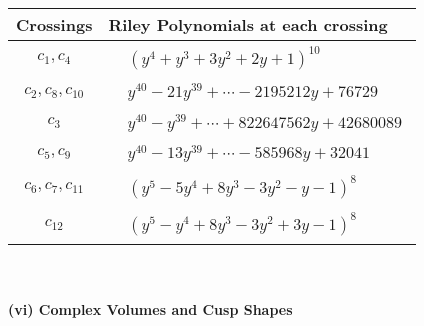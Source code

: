 \documentclass[1p]{elsarticle_modified}
\theoremstyle{definition}
\begin{document}
\begin{tabular}{m{50pt}|m{274pt}}
Crossings & \hspace{64pt}Riley Polynomials at each crossing \\
\hline $$\begin{aligned}c_{1},c_{4}\end{aligned}$$&$\begin{aligned}
&(y^4+y^3+3 y^2+2 y+1)^{10}
\end{aligned}$\\
\hline $$\begin{aligned}c_{2},c_{8},c_{10}\end{aligned}$$&$\begin{aligned}
&y^{40}-21 y^{39}+\cdots-2195212 y+76729
\end{aligned}$\\
\hline $$\begin{aligned}c_{3}\end{aligned}$$&$\begin{aligned}
&y^{40}- y^{39}+\cdots+822647562 y+42680089
\end{aligned}$\\
\hline $$\begin{aligned}c_{5},c_{9}\end{aligned}$$&$\begin{aligned}
&y^{40}-13 y^{39}+\cdots-585968 y+32041
\end{aligned}$\\
\hline $$\begin{aligned}c_{6},c_{7},c_{11}\end{aligned}$$&$\begin{aligned}
&(y^5-5 y^4+8 y^3-3 y^2- y-1)^8
\end{aligned}$\\
\hline $$\begin{aligned}c_{12}\end{aligned}$$&$\begin{aligned}
&(y^5- y^4+8 y^3-3 y^2+3 y-1)^8
\end{aligned}$\\
\hline
\end{tabular}\\~\\
\newpage\flushleft \textbf{(vi) Complex Volumes and Cusp Shapes}
\end{document}
